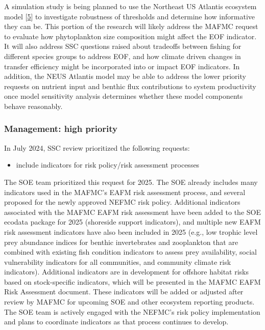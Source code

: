 \documentclass[
  10pt,
]{article}
\providecommand{\tightlist}{%
  \setlength{\itemsep}{0pt}\setlength{\parskip}{0pt}}
\begin{document}
A simulation study is being planned to use the Northeast US Atlantis
ecosystem model
{[}\protect\hyperlink{ref-caracappa_northeast_2022}{5}{]} to investigate
robustness of thresholds and determine how informative they can be. This
portion of the research will likely address the MAFMC request to
evaluate how phytoplankton size composition might affect the EOF
indicator. It will also address SSC questions raised about tradeoffs
between fishing for different species groups to address EOF, and how
climate driven changes in transfer efficiency might be incorporated into
or impact EOF indicators. In addition, the NEUS Atlantis model may be
able to address the lower priority requests on nutrient input and
benthic flux contributions to system productivity once model sensitivity
analysis determines whether these model components behave reasonably.

\hypertarget{management-high-priority}{%
\subsubsection{Management: high
priority}\label{management-high-priority}}

In July 2024, SSC review prioritized the following requests:

\begin{itemize}
\tightlist
\item
  include indicators for risk policy/risk assessment processes
\end{itemize}

The SOE team prioritized this request for 2025. The SOE already includes
many indicators used in the MAFMC's EAFM risk assessment process, and
several proposed for the newly approved NEFMC risk policy. Additional
indicators associated with the MAFMC EAFM risk assessment have been
added to the SOE ecodata package for 2025 (shoreside support
indicators), and multiple new EAFM risk assessment indicators have also
been included in 2025 (e.g., low trophic level prey abundance indices
for benthic invertebrates and zooplankton that are combined with
existing fish condition indicators to assess prey availability, social
vulnerability indicators for all communities, and community climate risk
indicators). Additional indicators are in development for offshore
habitat risks based on stock-specific indicators, which will be
presented in the MAFMC EAFM Risk Assessment document. These indicators
will be added or adjusted after review by MAFMC for upcoming SOE and
other ecosystem reporting products. The SOE team is actively engaged
with the NEFMC's risk policy implementation and plans to coordinate
indicators as that process continues to develop.
\end{document}
